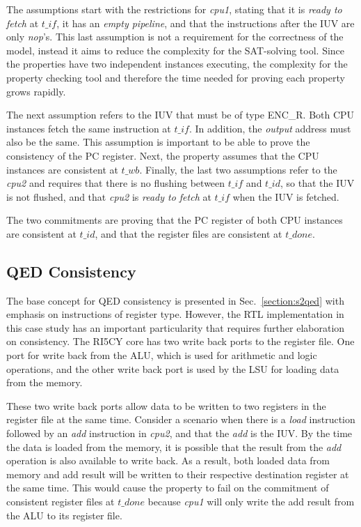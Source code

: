 The assumptions start with the restrictions for \textit{cpu1}, stating that it is \textit{ready to fetch} at $t\_if$, it has an \textit{empty pipeline}, and that the instructions after the IUV are only \textit{nop}’s. This last assumption is not a requirement for the correctness of the model, instead it aims to reduce the complexity for the SAT-solving tool. Since the \SSQED{} properties have two independent instances executing, the complexity for the property checking tool and therefore the time needed for proving each property grows rapidly.

The next assumption refers to the IUV that must be of type ENC\_R. Both CPU instances fetch the same instruction at $t\_if$. In addition, the \textit{output} address must also be the same. This assumption is important to be able to prove the consistency of the PC register. Next, the property assumes that the CPU instances are consistent at $t\_wb$. Finally, the last two assumptions refer to the \textit{cpu2} and requires that there is no flushing between $t\_if$ and $t\_id$, so that the IUV is not flushed, and that \textit{cpu2} is \textit{ready to fetch} at $t\_if$ when the IUV is fetched.

The two commitments are proving that the PC register of both CPU instances are consistent at $t\_id$, and that the register files are consistent at $t\_done$.

\subsection*{QED Consistency}

The base concept for QED consistency is presented in Sec.~\ref{section:s2qed} with emphasis on instructions of register type. However, the RTL implementation in this case study has an important particularity that requires further elaboration on consistency. The RI5CY core has two write back ports to the register file. One port for write back from the ALU, which is used for arithmetic and logic operations, and the other write back port is used by the LSU for loading data from the memory.

These two write back ports allow data to be written to two registers in the register file at the same time. Consider a scenario when there is a \textit{load} instruction followed by an \textit{add} instruction in \textit{cpu2}, and that the \textit{add} is the IUV. By the time the data is loaded from the memory, it is possible that the result from the \textit{add} operation is also available to write back. As a result, both loaded data from memory and add result will be written to their respective destination register at the same time. This would cause the \SSQED{} property to fail on the commitment of consistent register files at $t\_done$ because \textit{cpu1} will only write the add result from the ALU to its register file.

